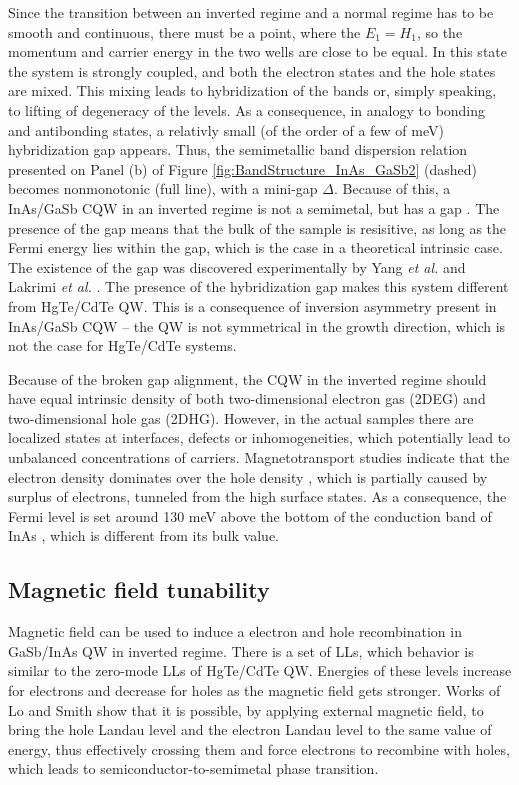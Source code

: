 \documentclass[titlepage,a4paper]{book}
\newcommand{\wciecie}{\quad\phantom{v}}
\begin{document}
Since the transition between an inverted regime and a normal regime has to be smooth and continuous, there must be a point, where the $E_1 = H_1$, so the momentum and carrier energy in the two wells are close to be equal. In this state the system is strongly coupled, and both the electron states and the hole states are mixed. This mixing leads to hybridization of the bands or, simply speaking, to lifting of degeneracy of the levels. As a consequence, in analogy to bonding and antibonding states, a relativly small (of the order of a few of meV) hybridization gap appears. Thus, the semimetallic band dispersion relation presented on Panel (b) of Figure \ref{fig:BandStructure_InAs_GaSb2} (dashed) becomes nonmonotonic (full line), with a mini-gap $\Delta$. Because of this, a InAs/GaSb CQW in an inverted regime is not a semimetal, but has a gap \cite{Altarelli_BandStructure}. The presence of the gap means that the bulk of the sample is resisitive, as long as the Fermi energy lies within the gap, which is the case in a theoretical intrinsic case. The existence of the gap was discovered experimentally by Yang \textit{et al.} \cite{Yang_BandStructure} and Lakrimi \textit{et al.} \cite{Lakrimi_BandStructure}. The presence of the hybridization gap makes this system different from HgTe/CdTe QW. This is a consequence of inversion asymmetry present in InAs/GaSb CQW -- the QW is not symmetrical in the growth direction, which is not the case for HgTe/CdTe systems.

Because of the broken gap alignment, the CQW in the inverted regime should have equal intrinsic density of both two-dimensional electron gas (2DEG) and two-dimensional hole gas (2DHG). However, in the actual samples there are localized states at interfaces, defects or inhomogeneities, which potentially lead to unbalanced concentrations of carriers. Magnetotransport studies indicate that the electron density dominates over the hole density \cite{Petchsingh_BandOrdering}\cite{Munekata_BandOrdering}, which is partially caused by surplus of electrons, tunneled from the high surface states. As a consequence, the Fermi level is set around 130 meV above the bottom of the conduction band of InAs \cite{Nguyen_Mobility}, which is different from its bulk value.

\subsection{Magnetic field tunability}
\wciecie
Magnetic field can be used to induce a electron and hole recombination in GaSb/InAs QW in inverted regime. There is a set of LLs, which behavior is similar to the zero-mode LLs of HgTe/CdTe QW. Energies of these levels increase for electrons and decrease for holes as the magnetic field gets stronger. Works of Lo \cite{Lo_MagneticField} and Smith \cite{Smith_MagneticField} show that it is possible, by applying external magnetic field, to bring the hole Landau level and the electron Landau level to the same value of energy, thus effectively crossing them and force electrons to recombine with holes, which leads to semiconductor-to-semimetal phase transition.
\end{document}
